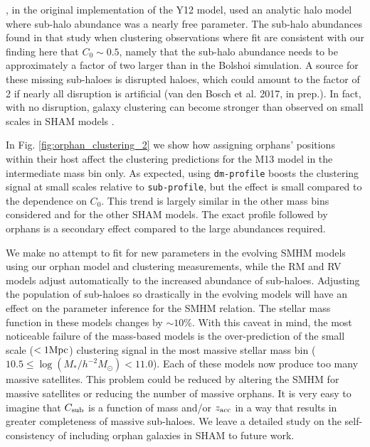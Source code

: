 \documentclass[useAMS,fleqn,usenatbib]{mnras}
\begin{document}
\citet{Yang:2012ew}, in the original implementation of the Y12 model, used an analytic halo model where sub-halo abundance was a nearly free parameter.  The sub-halo abundances found in that study when clustering observations where fit are consistent with our finding here that $C_0 \sim 0.5$, namely that the sub-halo abundance needs to be approximately a factor of two larger than in the Bolshoi simulation.  A source for these missing sub-haloes is disrupted haloes, which could amount to the factor of 2 if nearly all disruption is artificial (van den Bosch et al. 2017, in prep.).  In fact, with no disruption, galaxy clustering can become stronger than observed on small scales in SHAM models \citep{Watson:2012fu}.  

In Fig. \ref{fig:orphan_clustering_2} we show how assigning orphans' positions within their host affect the clustering predictions for the M13 model in the intermediate mass bin only.  As expected, using {\tt dm-profile} boosts the clustering signal at small scales relative to {\tt sub-profile}, but the effect is small compared to the dependence on $C_{0}$.  This trend is largely similar in the other mass bins considered and for the other SHAM models.  The exact profile followed by orphans is a secondary effect compared to the large abundances required.

We make no attempt to fit for new parameters in the evolving SMHM models using our orphan model and clustering measurements, while the RM and RV models adjust automatically to the increased abundance of sub-haloes.  Adjusting the population of sub-haloes so drastically in the evolving models will have an effect on the parameter inference for the SMHM relation. The stellar mass function in these models changes by $\sim 10\%$.  With this caveat in mind, the most noticeable failure of the mass-based models is the over-prediction of the small scale ($< 1 {\rm Mpc}$) clustering signal in the most massive stellar mass bin ($10.5\leq \log(M_*/h^{-2}M_{\odot})<11.0$).  Each of these models now produce too many massive satellites.  This problem could be reduced by altering the SMHM for massive satellites or reducing the number of massive orphans. It is very easy to imagine that $C_{\rm sub}$ is a function of mass and/or $z_{\rm acc}$ in a way that results in greater completeness of massive sub-haloes.  We leave a detailed study on the self-consistency of including orphan galaxies in SHAM to future work.
\end{document}
